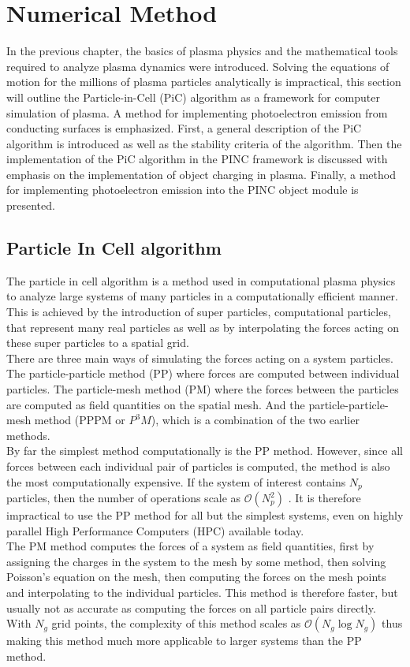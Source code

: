 \chapter{Numerical Method}
\label{sec:methods}
In the previous chapter, the basics of plasma physics and the mathematical tools required to analyze plasma dynamics were introduced. Solving the equations of motion for the millions of plasma particles analytically is impractical, this section will outline the Particle-in-Cell (PiC) algorithm as a framework for computer simulation of plasma. A method for implementing photoelectron emission from conducting surfaces is emphasized. First, a general description of the PiC algorithm is introduced as well as the stability criteria of the algorithm. Then the implementation of the PiC algorithm in the PINC framework is discussed with emphasis on the implementation of object charging in plasma. Finally, a method for implementing photoelectron emission into the PINC object module is presented.

\section{Particle In Cell algorithm}
The particle in cell algorithm is a method used in computational plasma physics to analyze large systems of many particles in a computationally efficient manner. This is achieved by the introduction of super particles, computational particles, that represent many real particles as well as by interpolating the forces acting on these super particles to a spatial grid.\\
There are three main ways of simulating the forces acting on a system particles. The particle-particle method (PP) where forces are computed between individual particles. The particle-mesh method (PM) where the forces between the particles are computed as field quantities on the spatial mesh. And the particle-particle-mesh method (PPPM or $P^3M$), which is a combination of the two earlier methods.\\
By far the simplest method computationally is the PP method. However, since all forces between each individual pair of particles is computed, the method is also the most computationally expensive. If the system of interest contains $N_p$ particles, then the number of operations scale as $\mathcal{O}(N^2_p)$ . It is therefore impractical to use the PP method for all but the simplest systems, even on highly parallel High Performance Computers (HPC) available today.\\
The PM method computes the forces of a system as field quantities, first by assigning the charges in the system to the mesh by some method, then solving Poisson's equation on the mesh, then computing the forces on the mesh points and interpolating to the individual particles. This method is therefore faster, but usually not as accurate as computing the forces on all particle pairs directly. With $N_g$ grid points, the complexity of this method scales as $\mathcal{O}(N_g \log{N_g})$ thus making this method much more applicable to larger systems than the PP method.

